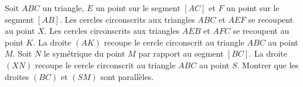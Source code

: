 Soit $ABC$ un triangle, $E$ un point sur le segment $[AC]$ et $F$ un point sur le segment $[AB]$. Les cercles circonscrits aux triangles $ABC$ et $AEF$ se recoupent au point $X$. Les cercles circonscrits aux triangles $AEB$ et $AFC$ se recoupent au point $K$. La droite $(AK)$ recoupe le cercle circonscrit au triangle $ABC$ au point $M$. Soit $N$ le symétrique du point $M$ par rapport au segment $[BC]$. La droite $(XN)$ recoupe le cercle circonscrit au triangle $ABC$ au point $S$. Montrer que les droites $(BC)$ et $(SM)$ sont parallèles.
